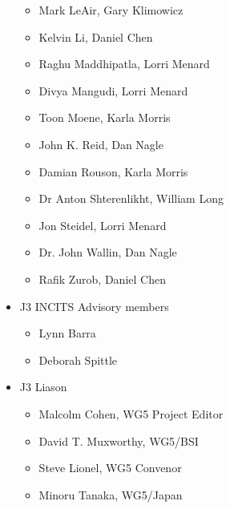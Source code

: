 \documentclass[10pt,letterpaper,twoside]{article}
\begin{document}
\begin{itemize}
\begin{itemize}
\item{Mark LeAir, Gary Klimowicz}

\item{Kelvin Li, Daniel Chen}

\item{Raghu Maddhipatla, Lorri Menard}

\item{Divya Mangudi, Lorri Menard}

\item{Toon Moene, Karla Morris}

\item{John K. Reid, Dan Nagle}

\item{Damian Rouson, Karla Morris}

\item{Dr Anton Shterenlikht, William Long}

\item{Jon Steidel, Lorri Menard}

\item{Dr. John Wallin, Dan Nagle}

\item{Rafik Zurob, Daniel Chen}

\end{itemize}

\item{J3 INCITS Advisory members}

\begin{itemize}

\item{Lynn Barra}

\item{Deborah Spittle}

\end{itemize}

\item{J3 Liason}

\begin{itemize}

\item{Malcolm Cohen, WG5 Project Editor}

\item{David T. Muxworthy, WG5/BSI}

\item{Steve Lionel, WG5 Convenor}

\item{Minoru Tanaka, WG5/Japan}

\end{itemize}

\end{itemize}
\end{document}
